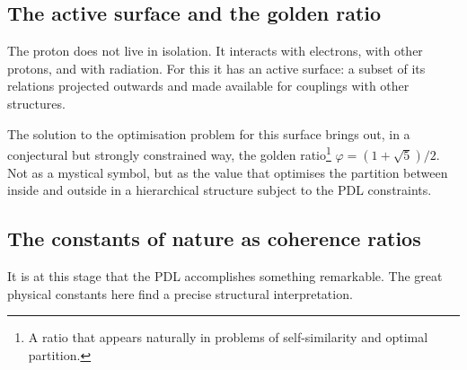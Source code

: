 \documentclass[12pt, a4paper, openright]{book}
\begin{document}
\subsection*{The active surface and the golden ratio}

The proton does not live in isolation. It interacts with electrons, with other protons, and with radiation. For this it has an active surface: a subset of its relations projected outwards and made available for couplings with other structures.

\medskip

The solution to the optimisation problem for this surface brings out, in a conjectural but strongly constrained way, the golden ratio\footnote{A ratio that appears naturally in problems of self-similarity and optimal partition.} $\varphi = (1+\sqrt{5})/2$. Not as a mystical symbol, but as the value that optimises the partition between inside and outside in a hierarchical structure subject to the PDL constraints.

\subsection*{The constants of nature as coherence ratios}

It is at this stage that the PDL accomplishes something remarkable. The great physical constants here find a precise structural interpretation.

\medskip

\medskip
\end{document}
